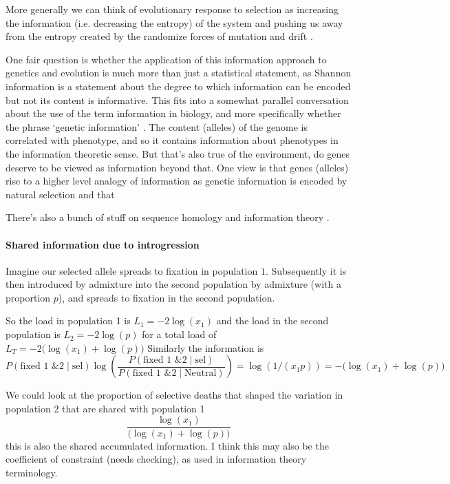 \documentclass[a4paper,10pt]{article}
\begin{document}
More generally we can think of evolutionary response to selection as
increasing the information (i.e. decreasing the entropy) of the system \citep{Frank12} and pushing us away from the
entropy created by the randomize forces of mutation and drift \citep{IWASA1988}.


One fair question is whether the application of this information
approach to genetics and evolution is much more than just a
statistical statement, as Shannon information is a statement about the
degree to which information can be encoded but not its content is informative. 
This fits into a somewhat parallel conversation about the use of the term
information in biology, and more specifically whether the phrase
`genetic information' . The content (alleles) of the genome is correlated with
phenotype, and so it contains information about phenotypes in the information
theoretic sense. But that's also true of the environment, do genes
deserve to be viewed as information beyond that. 
One view is that genes (alleles) rise to a higher level analogy of information as genetic information is encoded by natural
selection \citet{smith1999idea,MaynardSmith05Info} and that \citet{bergstrom2011transmission}

There's also a bunch of stuff on sequence homology and information
theory \citep{koonin2016meaning}.

\paragraph{Shared information due to introgression}
Imagine our selected allele spreads to fixation in population
$1$. Subsequently it is then introduced by admixture into the second population by
admixture (with a proportion $p$), and spreads to fixation in the
second population. 

So the load in population 1 is $L_1 = -2\log(x_1)$ and the load in the
second population is $L_2 = -2\log(p)$ for a total load of $L_T = -2
\big(\log(x_1)+\log(p) \big)$
Similarly the information is 
\begin{equation}
P(\textrm{fixed 1 \& 2} \mid \textrm{sel}) \log \left(\frac{P(\textrm{fixed 1 \& 2} \mid \textrm{sel})}{P(\textrm{fixed
    1 \& 2} \mid \textrm{Neutral})} \right) = \log(1/(x_1 p)) = -
\big(\log(x_1)+\log(p) \big)
\end{equation}

We could look at the proportion of
selective deaths that shaped the variation in population 2 that are
shared with population 1
\begin{equation}
\frac{\log(x_1)}{\big(\log(x_1)+\log(p) \big)}
\end{equation}
this is also the shared accumulated information. I think this may also be the
coefficient of constraint (needs checking), as used in information theory terminology.
\end{document}

